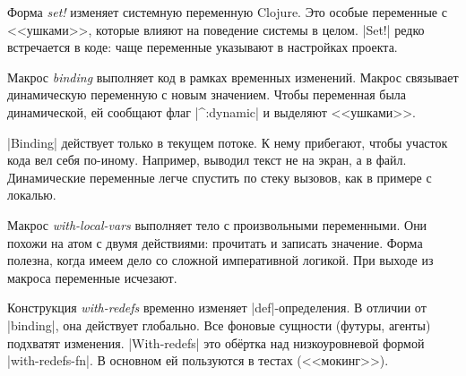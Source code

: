 Форма \emph{set!} изменяет системную переменную Clojure. Это особые переменные с
<<ушками>>, которые влияют на поведение системы в целом. \spverb|Set!| редко
встречается в коде: чаще переменные указывают в настройках проекта.

Макрос \emph{binding} выполняет код в рамках временных изменений. Макрос
связывает динамическую переменную с новым значением. Чтобы переменная была
динамической, ей сообщают флаг \spverb|^:dynamic| и выделяют <<ушками>>.

\spverb|Binding| действует только в текущем потоке. К нему прибегают, чтобы
участок кода вел себя по-иному. Например, выводил текст не на экран, а в
файл. Динамические переменные легче спустить по стеку вызовов, как в примере с
локалью.

Макрос \emph{with-local-vars} выполняет тело с произвольными переменными. Они
похожи на атом с двумя действиями: прочитать и записать значение. Форма полезна,
когда имеем дело со сложной императивной логикой. При выходе из макроса
переменные исчезают.

Конструкция \emph{with-redefs} временно изменяет \spverb|def|-определения. В
отличии от \spverb|binding|, она действует глобально. Все фоновые сущности
(футуры, агенты) подхватят изменения. \spverb|With-redefs| это об\"{е}ртка над
низкоуровневой формой \spverb|with-redefs-fn|. В основном ей пользуются в тестах
(<<мокинг>>).
